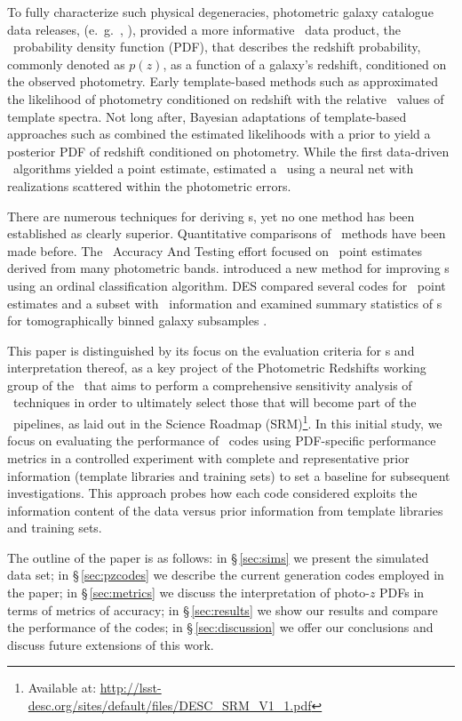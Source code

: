 To fully characterize such physical degeneracies, photometric galaxy catalogue data releases, (e.~g.~\citet{Erben:2013}, \citet{de_Jong:17}), provided a more informative \pz\ data product, the \pz\ probability density function (PDF), that describes the redshift probability, commonly denoted as $p(z)$, as a function of a galaxy's redshift, conditioned on the observed photometry.
Early template-based methods such as \citet{Fernandezsoto:99} approximated the likelihood of photometry conditioned on redshift with the relative \chisq\ values of template spectra.
Not long after, Bayesian adaptations of template-based approaches such as \citet{Benitez:00} combined the estimated likelihoods with a prior to yield a posterior PDF of redshift conditioned on photometry.
While the first data-driven \pz\ algorithms yielded a point estimate, \citet{Firth:03} estimated a \pzpdf\ using a neural net with realizations scattered within the photometric errors.

There are numerous techniques for deriving \pzpdf s, yet no one method has been established as clearly superior.
Quantitative comparisons of \pz\ methods have been made before.
The \Pz\ Accuracy And Testing \citep[\textsc{PHAT},][]{Hildebrandt:10} effort focused on \pz\ point estimates derived from many photometric bands.
\citet{Rau:2015} introduced a new method for improving \pzpdf s using an ordinal classification algorithm.
\textsc{DES} compared several codes for \pz\ point estimates and a subset with \pzpdf\ information \citep{Sanchez:14} and examined summary statistics of \pzpdf s for tomographically binned galaxy subsamples \citep{Bonnett:16}.

This paper is distinguished by its focus on the evaluation criteria for \pzpdf s and interpretation thereof, as a key project of the Photometric Redshifts working group of the \lsstdesc\ that aims to perform a comprehensive sensitivity analysis of \pzpdf\ techniques in order to ultimately select those that will become part of the \lsst\ pipelines, as laid out in the Science Roadmap (SRM)\footnote{Available at: \url{http://lsst-desc.org/sites/default/files/DESC_SRM_V1_1.pdf}}.
In this initial study, we focus on evaluating the performance of \pzpdf\ codes using PDF-specific performance metrics in a controlled experiment with complete and representative prior information (template libraries and training sets) to set a baseline for subsequent investigations.
This approach probes how each code considered exploits the information content of the data versus prior information from template libraries and training sets.

The outline of the paper is as follows: in \S\,\ref{sec:sims} we present the simulated data set; in \S\,\ref{sec:pzcodes} we describe the current generation codes employed in the paper; in \S\,\ref{sec:metrics} we discuss the interpretation of photo-$z$ PDFs in terms of metrics of accuracy; in \S\,\ref{sec:results} we show our results and compare the performance of the codes; in \S\,\ref{sec:discussion} we offer our conclusions and discuss future extensions of this work.
